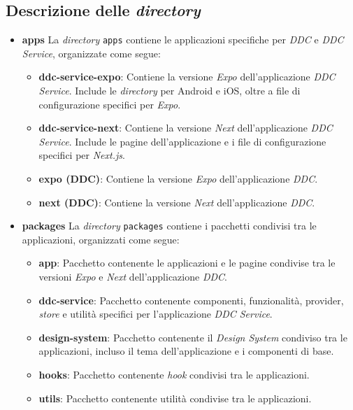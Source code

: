 \subsection{Descrizione delle \textit{directory}}
\begin{itemize}
    \item \textbf{apps}
    La \textit{directory} \texttt{apps} contiene le applicazioni specifiche per \textit{DDC} e \textit{DDC Service}, organizzate come segue:
    \begin{itemize}
        \item \textbf{ddc-service-expo}: Contiene la versione \textit{Expo} dell'applicazione \textit{DDC Service}. Include le \textit{directory} per Android e iOS, oltre a file di configurazione specifici per \textit{Expo}.
        \item \textbf{ddc-service-next}: Contiene la versione \textit{Next} dell'applicazione \textit{DDC Service}. Include le pagine dell'applicazione e i file di configurazione specifici per \textit{Next.js}.
        \item \textbf{expo (DDC)}: Contiene la versione \textit{Expo} dell'applicazione \textit{DDC}.
        \item \textbf{next (DDC)}: Contiene la versione \textit{Next} dell'applicazione \textit{DDC}.
    \end{itemize}

    \item \textbf{packages}
    La \textit{directory} \texttt{packages} contiene i pacchetti condivisi tra le applicazioni, organizzati come segue:
    \begin{itemize}
        \item \textbf{app}: Pacchetto contenente le applicazioni e le pagine condivise tra le versioni \textit{Expo} e \textit{Next} dell'applicazione \textit{DDC}.
        \item \textbf{ddc-service}: Pacchetto contenente componenti, funzionalità, provider, \textit{store} e utilità specifici per l'applicazione \textit{DDC Service}.
        \item \textbf{design-system}: Pacchetto contenente il \textit{Design System} condiviso tra le applicazioni, incluso il tema dell'applicazione e i componenti di base.
        \item \textbf{hooks}: Pacchetto contenente \textit{hook} condivisi tra le applicazioni.
        \item \textbf{utils}: Pacchetto contenente utilità condivise tra le applicazioni.
    \end{itemize}


\end{itemize}
